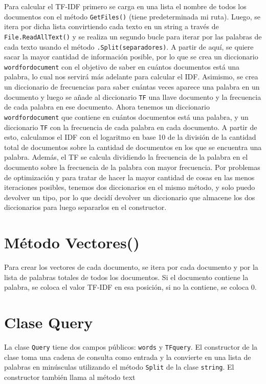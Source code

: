 \documentclass{article}
\begin{document}
Para calcular el TF-IDF primero se carga en una lista el nombre de todos los documentos con el método \texttt{GetFiles()} (tiene predeterminada mi ruta). Luego, se itera por dicha lista convirtiendo cada texto en un string a través de \texttt{File.ReadAllText()} y se realiza un segundo bucle para iterar por las palabras de cada texto usando el método \texttt{.Split(separadores)}. A partir de aquí, se quiere sacar la mayor cantidad de información posible, por lo que se crea un diccionario \texttt{wordfordocument} con el objetivo de saber en cuántos documentos está una palabra, lo cual nos servirá más adelante para calcular el IDF. Asimismo, se crea un diccionario de frecuencias para saber cuántas veces aparece una palabra en un documento y luego se añade al diccionario \texttt{TF} una llave documento y la frecuencia de cada palabra en ese documento. Ahora tenemos un diccionario \texttt{wordfordocument} que contiene en cuántos documentos está una palabra, y un diccionario \texttt{TF} con la frecuencia de cada palabra en cada documento. A partir de esto, calculamos el IDF con el logaritmo en base 10 de la división de la cantidad total de documentos sobre la cantidad de documentos en los que se encuentra una palabra. Además, el TF se calcula dividiendo la frecuencia de la palabra en el documento sobre la frecuencia de la palabra con mayor frecuencia. Por problemas de optimización y para tratar de hacer la mayor cantidad de cosas en las menos iteraciones posibles, tenemos dos diccionarios en el mismo método, y solo puedo devolver un tipo, por lo que decidí devolver un diccionario que almacene los dos diccionarios para luego separarlos en el constructor.

\section{Método Vectores()}

Para crear los vectores de cada documento, se itera por cada documento y por la lista de palabras totales de todos los documentos. Si el documento contiene la palabra, se coloca el valor TF-IDF en esa posición, si no la contiene, se coloca 0.

\section{{\Huge Clase Query}}

La clase \texttt{Query} tiene dos campos públicos: \texttt{words} y \texttt{TFquery}. El constructor de la clase toma una cadena de consulta como entrada y la convierte en una lista de palabras en minúsculas utilizando el método \texttt{Split} de la clase \texttt{string}. El constructor también llama al método text
\end{document}
